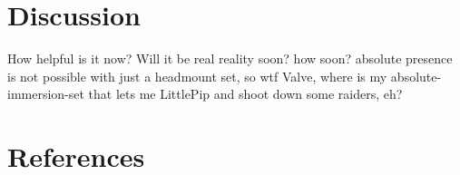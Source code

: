 \documentclass[10pt]{report}
\begin{document}
	
	
	
	


\chapter{Discussion}
How helpful is it now? Will it be real reality soon? how soon? absolute presence is not possible with just a headmount set, so wtf Valve, where is my absolute-immersion-set that lets me LittlePip and shoot down some raiders, eh?


\chapter{References}

\end{document}
